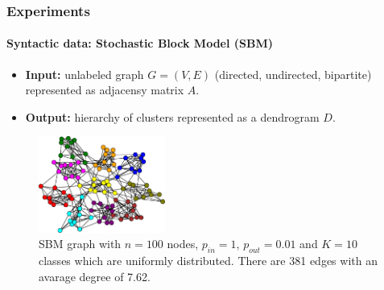 \documentclass{tum-presentation}
\begin{document}

\begin{frame} 
	\frametitle{Experiments}
	\framesubtitle{Syntactic data: Stochastic Block Model (SBM)}
	\begin{itemize}
		\item \textbf{\textcolor{TUMBlau}{Input:}} unlabeled graph $G=(V,E)$ (directed, undirected, bipartite) represented as adjacensy matrix $A$.
		\item \textbf{\textcolor{TUMBlau}{Output:}} hierarchy of clusters represented as a dendrogram $D$.
	\end{itemize}
	\begin{figure}[H]
		\begin{center}
			\includegraphics[width=0.37\textwidth]{../figures/2-block-model-sbm-graph.pdf}
			\caption{SBM graph with $n=100$ nodes, $p_{in}=1$, $p_{out}=0.01$ and $K=10$ classes which are uniformly distributed. There are 381 edges with an avarage degree of 7.62.}
			\label{fig:sbm_graph}
		\end{center}
	\end{figure}
\end{frame}
\end{document}
